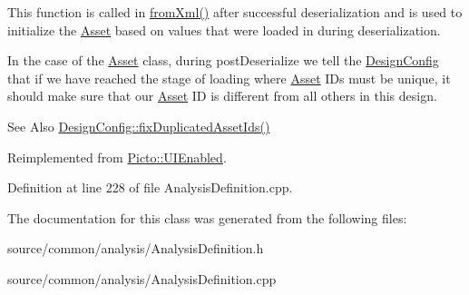 This function is called in \hyperlink{class_picto_1_1_asset_a8bed4da09ecb1c07ce0dab313a9aba67}{from\-Xml()} after successful deserialization and is used to initialize the \hyperlink{class_picto_1_1_asset}{Asset} based on values that were loaded in during deserialization. 

In the case of the \hyperlink{class_picto_1_1_asset}{Asset} class, during post\-Deserialize we tell the \hyperlink{class_picto_1_1_design_config}{Design\-Config} that if we have reached the stage of loading where \hyperlink{class_picto_1_1_asset}{Asset} I\-Ds must be unique, it should make sure that our \hyperlink{class_picto_1_1_asset}{Asset} I\-D is different from all others in this design. \begin{DoxySeeAlso}{See Also}
\hyperlink{class_picto_1_1_design_config_ab57e0738b97e4358ab09530cd6815fc0}{Design\-Config\-::fix\-Duplicated\-Asset\-Ids()} 
\end{DoxySeeAlso}


Reimplemented from \hyperlink{class_picto_1_1_u_i_enabled_ae1585113a496ff2c8de3293aa884b57b}{Picto\-::\-U\-I\-Enabled}.



Definition at line 228 of file Analysis\-Definition.\-cpp.



The documentation for this class was generated from the following files\-:\begin{DoxyCompactItemize}
\item 
source/common/analysis/Analysis\-Definition.\-h\item 
source/common/analysis/Analysis\-Definition.\-cpp\end{DoxyCompactItemize}
